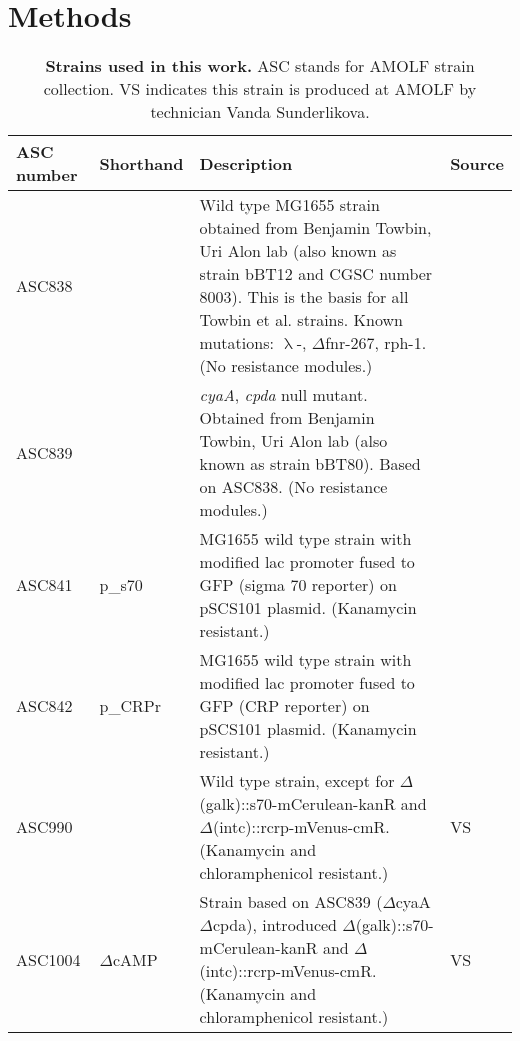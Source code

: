\FloatBarrier
\section{Methods}



\begin{table}[h]
	\begin{tabularx}{\textwidth}{llXl}

	\textbf{ASC number}	& \textbf{Shorthand} & \textbf{Description} & \textbf{Source}		\\
	\hline
	ASC838	& 				& Wild type MG1655 strain obtained from Benjamin Towbin, Uri Alon lab (also known as strain bBT12 and CGSC number 8003). This is the basis for all Towbin et al. strains. Known mutations: $\uplambda$-, 	$\Delta$fnr-267, rph-1. (No resistance modules.) & \cite{Towbin2017}  \\
	ASC839	& 				& \textit{cyaA}, \textit{cpda} null mutant. Obtained from Benjamin Towbin, Uri Alon lab (also known as strain bBT80). Based on ASC838. (No resistance modules.) & \cite{Towbin2017}  \\
	ASC841 & 	p\_s70 & MG1655 wild type strain with modified lac promoter fused to GFP (sigma 70 reporter) on pSCS101 plasmid. (Kanamycin resistant.) & \cite{Towbin2017} \\
    ASC842 &	p\_CRPr & MG1655 wild type strain with modified lac promoter fused to GFP (CRP reporter) on pSCS101 plasmid. (Kanamycin resistant.) & \cite{Towbin2017} \\
	ASC990  &  			& Wild type strain, except for $\Delta$(galk)::s70-mCerulean-kanR and $\Delta$(intc)::rcrp-mVenus-cmR. (Kanamycin and chloramphenicol resistant.) & VS \\
	ASC1004  & $\Delta$cAMP & Strain based on ASC839 ($\Delta$cyaA $\Delta$cpda), introduced $\Delta$(galk)::s70-mCerulean-kanR and $\Delta$(intc)::rcrp-mVenus-cmR. (Kanamycin and chloramphenicol resistant.) & VS \\
	\hline
	\end{tabularx}
	\caption{\textbf{Strains used in this work.} ASC stands for AMOLF strain collection. VS indicates this strain is produced at AMOLF by technician Vanda Sunderlikova.
    \label{table:CRP:strains}
    }
\end{table}

